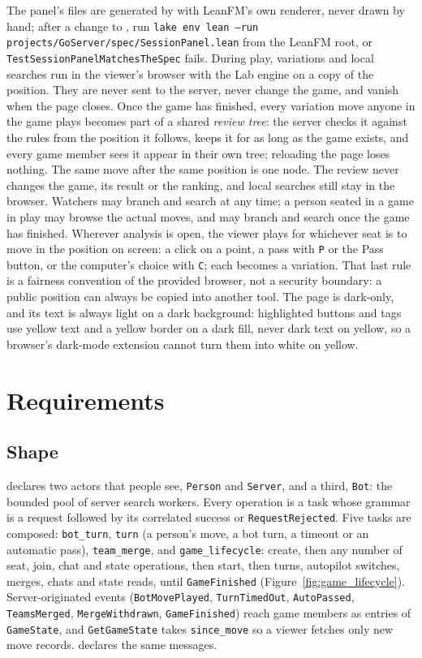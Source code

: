 \documentclass[11pt,oneside]{book}
\begin{document}
The panel's files are generated by  with LeanFM's
own renderer, never drawn by hand; after a change to ,
run \texttt{lake env lean --run projects/GoServer/spec/SessionPanel.lean} from
the LeanFM root, or \texttt{TestSessionPanelMatchesTheSpec} fails.
During play, variations and local searches run in the viewer's browser with
the Lab engine on a copy of the position. They are never sent to the server,
never change the game, and vanish when the page closes. Once the game has
finished, every variation move anyone in the game plays becomes part of a shared
\emph{review tree}: the server checks it against the rules from the position it
follows, keeps it for as long as the game exists, and every game member sees it
appear in their own tree; reloading the page loses nothing. The same move after
the same position is one node. The review never changes the game, its result or
the ranking, and local searches still stay in the browser. Watchers may branch and search at any
time; a person seated in a game in play may browse the actual moves, and may
branch and search once the game has finished. Wherever analysis is open, the viewer plays
for whichever seat is to move in the position on screen: a click on a point, a
pass with \texttt{P} or the Pass button, or the computer's choice with
\texttt{C}; each becomes a variation. That last rule is a fairness
convention of the provided browser, not a security boundary: a public position
can always be copied into another tool. The page is dark-only, and its text
is always light on a dark background: highlighted buttons and tags use yellow
text and a yellow border on a dark fill, never dark text on yellow, so a
browser's dark-mode extension cannot turn them into white on yellow.

\chapter{Requirements}
\section{Shape}
 declares two actors that people see,
\texttt{Person} and \texttt{Server}, and a third, \texttt{Bot}: the bounded pool
of server search workers. Every operation is a task whose grammar is a request
followed by its correlated success or \texttt{RequestRejected}. Five tasks are
composed: \texttt{bot\_turn}, \texttt{turn} (a person's move, a bot turn, a
timeout or an automatic pass), \texttt{team\_merge}, and
\texttt{game\_lifecycle}: create, then any number of seat, join, chat and state
operations, then start, then turns, autopilot switches, merges, chats and state
reads, until \texttt{GameFinished} (Figure~\ref{fig:game_lifecycle}).
Server-originated events (\texttt{BotMovePlayed}, \texttt{TurnTimedOut},
\texttt{AutoPassed}, \texttt{TeamsMerged}, \texttt{MergeWithdrawn},
\texttt{GameFinished}) reach game members as entries of \texttt{GameState}, and
\texttt{GetGameState} takes \texttt{since\_move} so a viewer fetches only new
move records.  declares the same messages.
\end{document}
